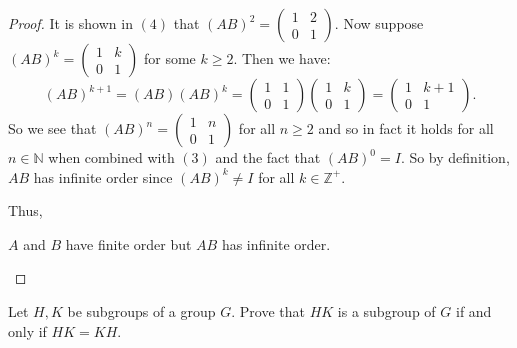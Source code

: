 \documentclass[addpoints,10pt]{exam}
\theoremstyle{plain}
\theoremstyle{definition}
\newtheorem{prob}[thm]{Problem}
\theoremstyle{plain}
\theoremstyle{plain}
\theoremstyle{definition}
\let\oldprob\prob
\let\endoldprob\endprob
\renewenvironment{prob}
  {\begin{singlespace}\oldprob}
  {\endoldprob\end{singlespace}}
\newcommand{\NN}{\ensuremath{\mathbb{N}}}
\newcommand{\ZZ}{\ensuremath{\mathbb{Z}}}
\begin{document}
\begin{proof}
It is shown in $(4)$ that $(AB)^{2}=\begin{pmatrix} 1 & 2 \\ 0 & 1 \end{pmatrix}$. Now suppose $(AB)^{k}=\begin{pmatrix} 1 & k \\ 0 & 1 \end{pmatrix}$ for some $k\geq 2$. Then we have:
$$(AB)^{k+1}=(AB)(AB)^{k}=\begin{pmatrix}
      1 & 1 \\
      0 & 1 \end{pmatrix}\begin{pmatrix} 1 & k \\ 0 & 1 \end{pmatrix}=\begin{pmatrix}
      1 & k+1 \\
      0 & 1 \end{pmatrix}.$$
So we see that $(AB)^{n}=\begin{pmatrix}
      1 & n \\
      0 & 1 \end{pmatrix}$ for all $n\geq 2$ and so in fact it holds for all $n\in \NN$ when combined with $(3)$ and the fact that $(AB)^{0}=I$. So by definition, $AB$ has infinite order since $(AB)^k\neq I$ for all $k\in \ZZ^{+}$.

      Thus,
      \begin{center}
        $A$ and $B$ have finite order but $AB$ has infinite order.
      \end{center}

\end{proof}
\endgroup
\newpage
\setcounter{thm}{9}   %

\begin{prob}
  Let $H,K$ be subgroups of a group $G$. Prove that $HK$ is a subgroup of $G$ if and only if $HK=KH$.
\end{prob}
\end{document}

